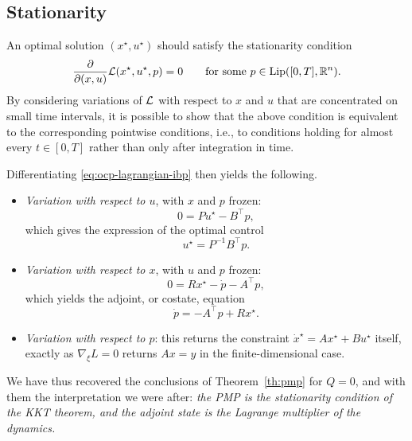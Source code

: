 \subsection{Stationarity}

An optimal solution $(x^\star, u^\star)$ should satisfy the stationarity condition
\begin{equation}
    \frac{\partial}{\partial (x,u)} \mathcal{L}(x^\star, u^\star, p) = 0
    \qquad \text{for some } p \in \operatorname{Lip}([0,T], \mathbb{R}^n).
\end{equation}
By considering variations of $\mathcal{L}$ with respect to $x$ and $u$ that are concentrated on small time intervals, it is possible to show that the above condition is equivalent to the corresponding pointwise conditions, i.e., to conditions holding for almost every $t\in[0,T]$ rather than only after integration in time.

Differentiating \eqref{eq:ocp-lagrangian-ibp} then yields the following.
\begin{itemize}
    \item \emph{Variation with respect to $u$}, with $x$ and $p$ frozen:
          \begin{equation}
              0 = P u^\star - B^\top p,
          \end{equation}
          which gives the expression of the optimal control
          \begin{equation}
              \label{eq:pmp-lagr-control}
              u^\star = P^{-1} B^\top p.
          \end{equation}

    \item \emph{Variation with respect to $x$}, with $u$ and $p$ frozen:
          \begin{equation}
              0 = R x^\star - \dot p - A^\top p,
          \end{equation}
          which yields the adjoint, or costate, equation
          \begin{equation}
              \label{eq:pmp-lagr-adjoint}
              \dot p = - A^\top p + R x^\star.
          \end{equation}

    \item \emph{Variation with respect to $p$}: this returns the constraint $\dot x^\star = Ax^\star + Bu^\star$ itself, exactly as $\nabla_\xi L = 0$ returns $Ax=y$ in the finite-dimensional case.
\end{itemize}
We have thus recovered the conclusions of Theorem~\ref{th:pmp} for $Q=0$, and with them the interpretation we were after: \emph{the PMP is the stationarity condition of the KKT theorem, and the adjoint state is the Lagrange multiplier of the dynamics.}

